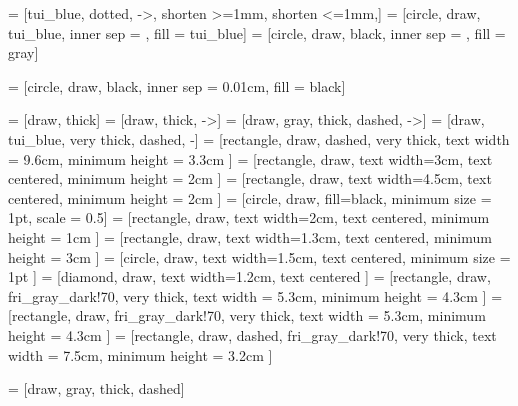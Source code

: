 
 = [tui_blue, dotted, ->, shorten >=1mm, shorten <=1mm,]
 = [circle, draw, tui_blue, inner sep = \rCircle, fill = tui_blue]
 = [circle, draw, black, inner sep = \rCircleCamera, fill = gray]

 = [circle, draw, black, inner sep = 0.01cm, fill = black]

 = [draw, thick]
 = [draw, thick, ->]
 = [draw, gray, thick, dashed, ->]
 = [draw, tui_blue, very thick, dashed, -]
 = [rectangle, draw, dashed, very thick, 
text width = 9.6cm,  minimum height = 3.3cm
]
 = [rectangle, draw,  
text width=3cm, text centered, minimum height = 2cm
]
 = [rectangle, draw,  
text width=4.5cm, text centered, minimum height = 2cm
]
 = [circle, draw, fill=black, minimum size = 1pt, scale = 0.5]
 = [rectangle, draw,  
text width=2cm, text centered, minimum height = 1cm
]
 = [rectangle, draw,  
text width=1.3cm, text centered, minimum height = 3cm
]
 = [circle, draw,  
text width=1.5cm, text centered, minimum size = 1pt
]
 = [diamond, draw,  
text width=1.2cm, text centered
]
 = [rectangle, draw, fri_gray_dark!70, very thick, 
text width = 5.3cm,  minimum height = 4.3cm
]
 = [rectangle, draw, fri_gray_dark!70, very thick, 
text width = 5.3cm,  minimum height = 4.3cm
]
 = [rectangle, draw, dashed, fri_gray_dark!70, very thick, 
text width = 7.5cm,  minimum height = 3.2cm
]



 = [draw, gray, thick, dashed]
